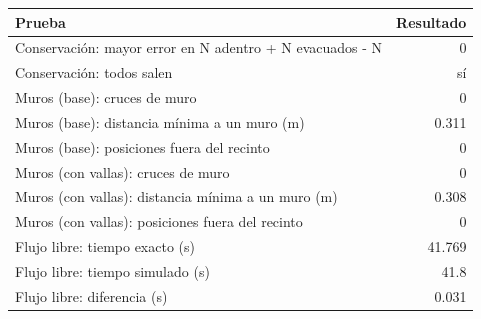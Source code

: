 \begin{tabular}{lr}
\toprule
Prueba & Resultado \\
\midrule
Conservación: mayor error en N adentro + N evacuados - N & 0 \\
Conservación: todos salen & sí \\
Muros (base): cruces de muro & 0 \\
Muros (base): distancia mínima a un muro (m) & 0.311 \\
Muros (base): posiciones fuera del recinto & 0 \\
Muros (con vallas): cruces de muro & 0 \\
Muros (con vallas): distancia mínima a un muro (m) & 0.308 \\
Muros (con vallas): posiciones fuera del recinto & 0 \\
Flujo libre: tiempo exacto (s) & 41.769 \\
Flujo libre: tiempo simulado (s) & 41.8 \\
Flujo libre: diferencia (s) & 0.031 \\
\bottomrule
\end{tabular}
